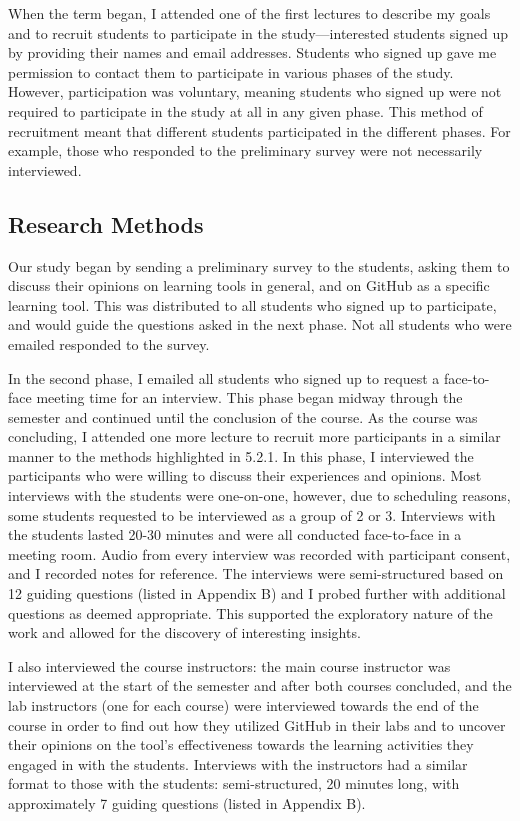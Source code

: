 When the term began, I attended one of the first lectures to describe my goals and to recruit students to participate in the study---interested students signed up by providing their names and email addresses. Students who signed up gave me permission to contact them to participate in various phases of the study. However, participation was voluntary, meaning students who signed up were not required to participate in the study at all in any given phase. This method of recruitment meant that different students participated in the different phases. For example, those who responded to the preliminary survey were not necessarily interviewed.

\subsection{Research Methods}
Our study began by sending a preliminary survey to the students, asking them to discuss their opinions on learning tools in general, and on GitHub as a specific learning tool. This was distributed to all students who signed up to participate, and would guide the questions asked in the next phase. Not all students who were emailed responded to the survey.

In the second phase, I emailed all students who signed up to request a face-to-face meeting time for an interview. This phase began midway through the semester and continued until the conclusion of the course. As the course was concluding, I attended one more lecture to recruit more participants in a similar manner to the methods highlighted in 5.2.1. In this phase, I interviewed the participants who were willing to discuss their experiences and opinions. Most interviews with the students were one-on-one, however, due to scheduling reasons, some students requested to be interviewed as a group of 2 or 3. Interviews with the students lasted 20-30 minutes and were all conducted face-to-face in a meeting room. Audio from every interview was recorded with participant consent, and I recorded notes for reference. The interviews were semi-structured based on 12 guiding questions (listed in Appendix B) and I probed further with additional questions as deemed appropriate. This supported the exploratory nature of the work and allowed for the discovery of interesting insights.

I also interviewed the course instructors: the main course instructor was interviewed at the start of the semester and after both courses concluded, and the lab instructors (one for each course) were interviewed towards the end of the course in order to find out how they utilized GitHub in their labs and to uncover their opinions on the tool's effectiveness towards the learning activities they engaged in with the students. Interviews with the instructors had a similar format to those with the students: semi-structured, 20 minutes long, with approximately 7 guiding questions (listed in Appendix B).

